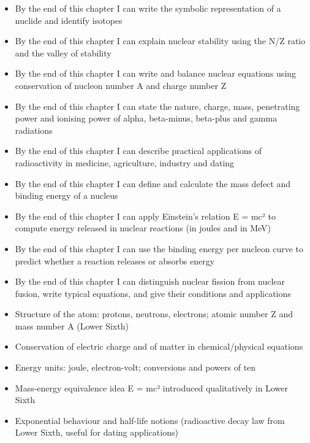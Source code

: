 \documentclass[11pt]{article}
\begin{document}
\begin{objectifs}
\begin{itemize}
\item By the end of this chapter I can write the symbolic representation of a nuclide and identify isotopes
\item By the end of this chapter I can explain nuclear stability using the N/Z ratio and the valley of stability
\item By the end of this chapter I can write and balance nuclear equations using conservation of nucleon number A and charge number Z
\item By the end of this chapter I can state the nature, charge, mass, penetrating power and ionising power of alpha, beta-minus, beta-plus and gamma radiations
\item By the end of this chapter I can describe practical applications of radioactivity in medicine, agriculture, industry and dating
\item By the end of this chapter I can define and calculate the mass defect and binding energy of a nucleus
\item By the end of this chapter I can apply Einstein's relation E = mc² to compute energy released in nuclear reactions (in joules and in MeV)
\item By the end of this chapter I can use the binding energy per nucleon curve to predict whether a reaction releases or absorbs energy
\item By the end of this chapter I can distinguish nuclear fission from nuclear fusion, write typical equations, and give their conditions and applications
\end{itemize}
\end{objectifs}

\begin{prerequis}
\begin{itemize}
\item Structure of the atom: protons, neutrons, electrons; atomic number Z and mass number A (Lower Sixth)
\item Conservation of electric charge and of matter in chemical/physical equations
\item Energy units: joule, electron-volt; conversions and powers of ten
\item Mass-energy equivalence idea E = mc² introduced qualitatively in Lower Sixth
\item Exponential behaviour and half-life notions (radioactive decay law from Lower Sixth, useful for dating applications)
\end{itemize}
\end{prerequis}
\end{document}
